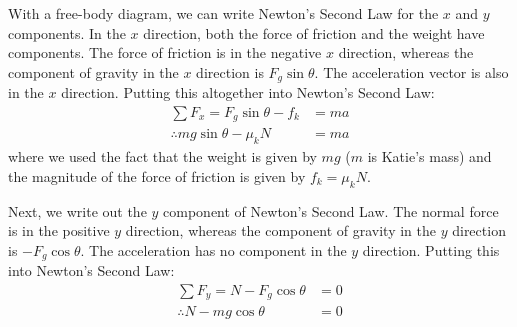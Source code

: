 \begin{problem}
With a free-body diagram, we can write Newton's Second Law for the $x$ and $y$ components. In the $x$ direction, both the force of friction and the weight have components. The force of friction is in the negative $x$ direction, whereas the component of gravity in the $x$ direction is $F_g\sin\theta$. The acceleration vector is also in the $x$ direction. Putting this altogether into Newton's Second Law:
\begin{align*}
\sum F_x = F_g\sin\theta - f_k &= ma\\
\therefore mg\sin\theta -\mu_k N &= ma
\end{align*}
where we used the fact that the weight is given by $mg$ ($m$ is Katie's mass) and the magnitude of the force of friction is given by $f_k=\mu_kN$.

Next, we write out the $y$ component of Newton's Second Law. The normal force is in the positive $y$ direction, whereas the component of gravity in the $y$ direction is $-F_g\cos\theta$. The acceleration has no component in the $y$ direction. Putting this into Newton's Second Law:
\begin{align*}
\sum F_y = N-F_g\cos\theta &=0\\
\therefore N-mg\cos\theta &=0
\end{align*}


\end{problem}
